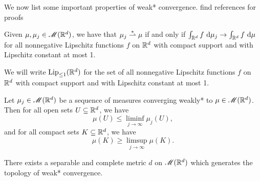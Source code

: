 We now list some important properties of weak* convergence. {\color{red} find references for proofs}
\begin{lemma} \label{lem:equivalentDefinitionOfWeak*Convergence}
    Given $\mu, \mu_j \in \mathscr{M}(\mathbb{R}^d)$, we have that $\mu_j \overset{\ast}{\rightharpoonup} \mu$ if and only if $\int_{\mathbb{R}^d} f \, \operatorname{d}\!{\mu_j} \to \int_{\mathbb{R}^d} f \, \operatorname{d}\!{\mu}$ for all nonnegative Lipschitz functions $f$ on $\mathbb{R}^d$ with compact support and with Lipschitz constant at most 1.
\end{lemma}
We will write $\operatorname{Lip}_{\leq 1}(\mathbb{R}^d)$ for the set of all nonnegative Lipschitz functions $f$ on $\mathbb{R}^d$ with compact support and with Lipschitz constant at most 1.
\begin{lemma} \label{lem:semicontinuityOfWeak*Convergence}
    Let $\mu_j \in \mathscr{M}(\mathbb{R}^d)$ be a sequence of measures converging weakly* to $\mu \in \mathscr{M}(\mathbb{R}^d)$. Then for all open sets $U \subseteq \mathbb{R}^d$, we have 
    \begin{equation}
        \mu(U) \leq \liminf_{j \to \infty} \mu_j(U),
    \end{equation}
    and for all compact sets $K \subseteq \mathbb{R}^d$, we have 
    \begin{equation}
        \mu(K) \geq \limsup_{j \to \infty} \mu(K).
    \end{equation}
\end{lemma}
\begin{lemma} \label{lem:metrizabilityofWeak*Convergence}
    There exists a separable and complete metric $d$ on $\mathscr{M}(\mathbb{R}^d)$ which generates the topology of weak* convergence.
\end{lemma}